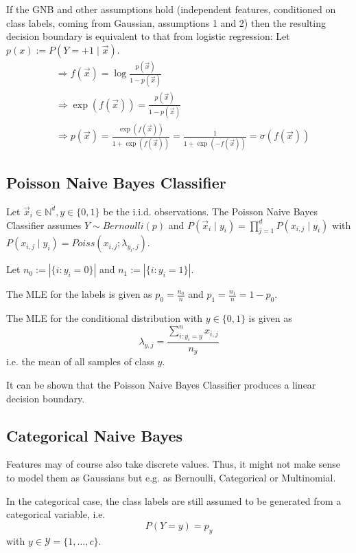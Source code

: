 If the GNB and other assumptions hold
(independent features, conditioned on
class labels, coming from Gaussian, assumptions 1 and 2)
then the resulting decision boundary
is equivalent to that from logistic regression:
Let $p(x) := P(Y = +1 \mid \vec{x})$.
\begin{align*}
&\Rightarrow f(\vec{x}) = \log{
	\frac{p(\vec{x})}{1 - p(\vec{x})}
} \\
&\Rightarrow \exp{(f(\vec{x}))}
= \frac{p(\vec{x})}{1 - p(\vec{x})} \\
&\Rightarrow p(\vec{x}) =
\frac{\exp{(f(\vec{x}))}}
{1 + \exp{(f(\vec{x}))}}
= \frac{1}{1 + \exp{(-f(\vec{x}))}}
= \sigma(f(\vec{x}))
\end{align*}


\subsection{Poisson Naive Bayes Classifier}
Let $\vec{x}_i \in \mathbb{N}^d, y \in \{0, 1\}$ be the
i.i.d. observations.
The Poisson Naive Bayes Classifier assumes
$Y \sim Bernoulli(p)$ and
$P(\vec{x}_i \mid y_i) = \prod_{j=1}^d{P(x_{i,j} \mid y_i)}$
with $P(x_{i,j} \mid y_i) = Poiss(x_{i, j}; \lambda_{y_i, j})$.

Let $n_0 := |\{i : y_i = 0\}|$ and
$n_1 := |\{i : y_i = 1\}|$.

The MLE for the labels is given as
$p_0 = \frac{n_0}{n}$
and $p_1 = \frac{n_1}{n} = 1 - p_0$.

The MLE for the conditional distribution
with $y \in \{0,1\}$ is given as
\begin{equation*}
\lambda_{y,j} = \frac{
	\sum_{i: y_i = y}^n{x_{i,j}}
}{n_y}
\end{equation*}
i.e. the mean of all samples of class $y$.

It can be shown that the Poisson Naive Bayes Classifier
produces a linear decision boundary.


\subsection{Categorical Naive Bayes}
Features may of course also take discrete values.
Thus, it might not make sense to model
them as Gaussians but e.g. as
Bernoulli, Categorical or Multinomial.

In the categorical case,
the class labels are still assumed to
be generated from a categorical variable, i.e.
\begin{equation*}
P(Y = y) = p_y
\end{equation*}
with $y \in \mathcal{Y} = \{1, \dotsc, c\}$.

